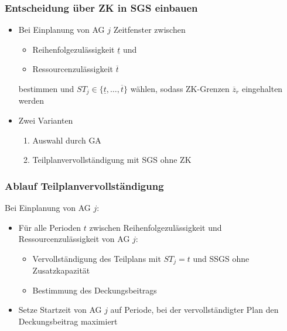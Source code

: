 \begin{frame}[noframenumbering]
	\frametitle{Entscheidung über ZK in SGS einbauen}
	\begin{itemize}
		\item Bei Einplanung von AG $j$ Zeitfenster zwischen
		\begin{itemize}
			\item Reihenfolgezulässigkeit $\underline{t}$ und
			\item Ressourcenzulässigkeit $\overline{t}$
		\end{itemize}
		bestimmen und $ST_j \in \{ \underline{t}, \ldots, \overline{t} \}$ wählen, sodass ZK-Grenzen $\overline{z}_r$ eingehalten werden\\[8mm]
		\item Zwei Varianten
		\begin{enumerate}
			\item Auswahl durch GA 
			\item Teilplanvervollständigung mit SGS ohne ZK
		\end{enumerate}
	\end{itemize}
\end{frame}

\begin{frame}[noframenumbering]
	\frametitle{Ablauf Teilplanvervollständigung}
	Bei Einplanung von AG $j$:
	\vspace*{2mm}
	\begin{itemize}
		\item Für alle Perioden $t$ zwischen Reihenfolgezulässigkeit und Ressourcenzulässigkeit von AG $j$:
		\begin{itemize}
			\item Vervollständigung des Teilplans mit $ST_j=t$ und SSGS ohne Zusatzkapazität
			\item Bestimmung des Deckungsbeitrags\\[3mm]
		\end{itemize}
		\item Setze Startzeit von AG $j$ auf Periode, bei der vervollständigter Plan den Deckungsbeitrag maximiert
	\end{itemize}
\end{frame}



